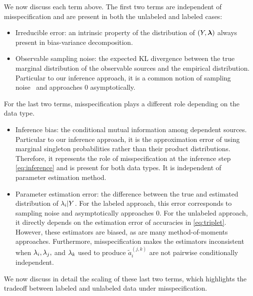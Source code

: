 We now discuss each term above. The first two terms are independent of misspecification and are present in both the unlabeled and labeled cases:
\begin{itemize}
  \setlength\itemsep{0em}
    \item Irreducible error: an intrinsic property of the distribution of $(Y, \bm{\lambda})$ always present in bias-variance decomposition. 
    \item %
    Observable sampling noise: the expected KL divergence between the true marginal distribution of the observable sources and the empirical distribution. Particular to our inference approach, it is a common notion of sampling noise~\citep{domingos2000unified, yang2020rethinking} and approaches $0$ asymptotically.
\end{itemize}

For the last two terms, misspecification plays a different role depending on the data type. 
\begin{itemize}
  \setlength\itemsep{0em}
    \item Inference bias: the conditional mutual information among dependent sources. Particular to our inference approach, it is the approximation error of using marginal singleton probabilities rather than their product distributions. Therefore, it represents the role of misspecification at the inference step \eqref{eq:inference} and is present for both data types. It is independent of parameter estimation method.
    \item Parameter estimation error: the difference between the true and estimated distribution of $\lambda_i | Y$. For the labeled approach, this error corresponds to sampling noise and asymptotically approaches $0$. For the unlabeled approach, it directly depends on the estimation error of accuracies in \eqref{eq:triplet}. However, these estimators are biased, as are many method-of-moments approaches. Furthermore, misspecification makes the estimators inconsistent when $\lambda_i, \lambda_j,$ and $\lambda_k$ used to produce $\widetilde{a}_i^{(j, k)}$ are not pairwise conditionally independent.
\end{itemize}

We now discuss in detail the scaling of these last two terms, which highlights the tradeoff between labeled and unlabeled data under misspecification.



